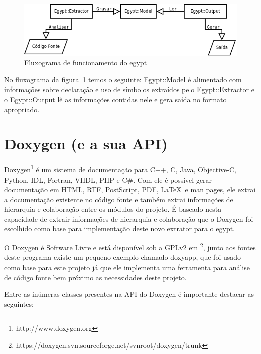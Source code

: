 \begin{figure}[h]
\center
\includegraphics[scale=0.4]{imagens/egypt-fluxogram}
\caption{Fluxograma de funcionamento do egypt}
\label{egypt-fluxogram}
\end{figure}

No fluxograma da figura~\ref{egypt-fluxogram} temos o seguinte: Egypt::Model é
alimentado com informações sobre declaração e uso de símbolos extraídos pelo
Egypt::Extractor e o Egypt::Output lê as informações contidas nele e gera saída
no formato apropriado.

\section{Doxygen (e a sua API)}

Doxygen\footnote{http://www.doxygen.org} é um sistema de documentação para C++,
C, Java, Objective-C, Python, IDL, Fortran, VHDL, PHP e C\#. Com ele é possível
gerar documentação em HTML, RTF, PostScript, PDF, \LaTeX\ e man pages, ele
extrai a documentação existente no código fonte e também extrai informações de
hierarquia e colaboração entre os módulos do projeto. É baseado nesta
capacidade de extrair informações de hierarquia e colaboração que o Doxygen foi
escolhido como base para implementação deste novo extrator para o egypt.

O Doxygen é Software Livre e está disponível sob a GPLv2 em
\footnote{https://doxygen.svn.sourceforge.net/svnroot/doxygen/trunk}, junto aos
fontes deste programa existe um pequeno exemplo chamado doxyapp, que foi usado
como base para este projeto já que ele implementa uma ferramenta para análise
de código fonte bem próximo as necessidades deste projeto.

Entre as inúmeras classes presentes na API do Doxygen é importante
destacar as seguintes:

